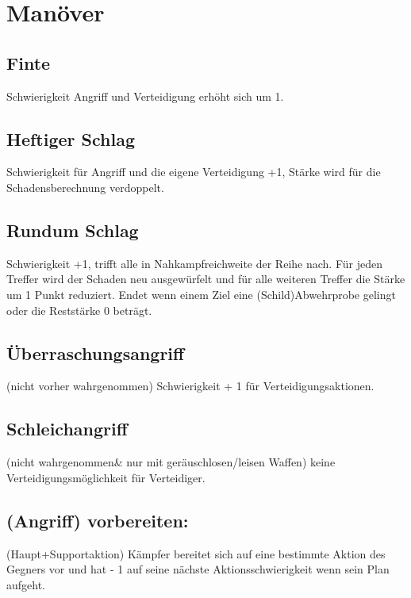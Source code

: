 \chapter{Manöver}
\label{Manöverliste}
\section{Finte}
Schwierigkeit Angriff und Verteidigung erhöht sich um 1.

\section{Heftiger Schlag}
 Schwierigkeit für Angriff und die eigene Verteidigung +1, Stärke wird für die Schadensberechnung verdoppelt.

\section{Rundum Schlag} Schwierigkeit +1, trifft alle in Nahkampfreichweite der Reihe nach. Für jeden Treffer wird der Schaden neu ausgewürfelt und für alle weiteren Treffer die Stärke um 1 Punkt reduziert. Endet wenn einem Ziel eine (Schild)Abwehrprobe gelingt oder die Reststärke 0 beträgt.

\section{Überraschungsangriff} (nicht vorher wahrgenommen) Schwierigkeit + 1 für Verteidigungsaktionen.

\section{Schleichangriff} (nicht wahrgenommen\& nur mit geräuschlosen/leisen Waffen) keine Verteidigungsmöglichkeit für Verteidiger.

\section{(Angriff) vorbereiten:} (Haupt+Supportaktion) Kämpfer bereitet sich auf eine bestimmte Aktion des Gegners vor und hat - 1 auf seine nächste Aktionsschwierigkeit wenn sein Plan aufgeht.

